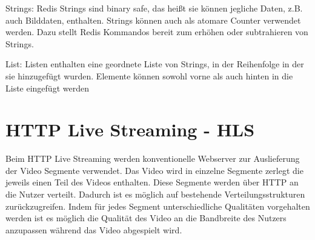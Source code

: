 Strings:
Redis Strings sind binary safe, das heißt sie können jegliche Daten, z.B. auch Bilddaten, enthalten. Strings können auch als atomare Counter verwendet werden. Dazu stellt Redis Kommandos bereit zum erhöhen oder subtrahieren von Strings.

List:
Listen enthalten eine geordnete Liste von Strings, in der Reihenfolge in der sie hinzugefügt wurden. Elemente können sowohl vorne als auch hinten in die Liste eingefügt werden

\section{HTTP Live Streaming - HLS}
Beim HTTP Live Streaming\cite{hls-sdt} werden konventionelle Webserver zur Auslieferung der Video Segmente verwendet. Das Video wird in einzelne Segmente zerlegt die jeweils einen Teil des Videos enthalten. Diese Segmente werden über HTTP an die Nutzer verteilt. Dadurch ist es möglich auf bestehende Verteilungsstrukturen zurückzugreifen. Indem für jedes Segment unterschiedliche Qualitäten vorgehalten werden ist es möglich die Qualität des Video an die Bandbreite des Nutzers anzupassen während das Video abgespielt wird.

